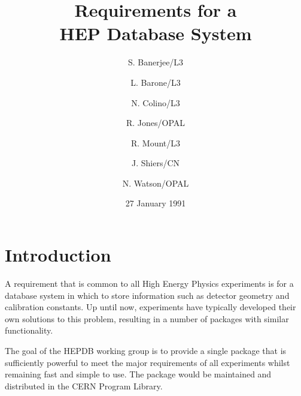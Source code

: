 

\title{Requirements for a \\ HEP Database System}
\author{S. Banerjee/L3 \and
        L. Barone/L3   \and
        N. Colino/L3   \and
        R. Jones/OPAL  \and
        R. Mount/L3    \and
        J. Shiers/CN   \and
        N. Watson/OPAL}
\date{27 January 1991}
\maketitle

\section{Introduction}
\par
A requirement that is common to all High Energy Physics experiments
is for a database system in which to store information such as
detector geometry and calibration constants. Up until now, experiments
have typically developed their own solutions to this problem, resulting
in a number of packages with similar functionality.
\par
The goal of the HEPDB working group is to provide a single package
that is sufficiently powerful to meet the major requirements of all
experiments whilst remaining fast and simple to use. The package
would be maintained and distributed in the CERN Program Library.

